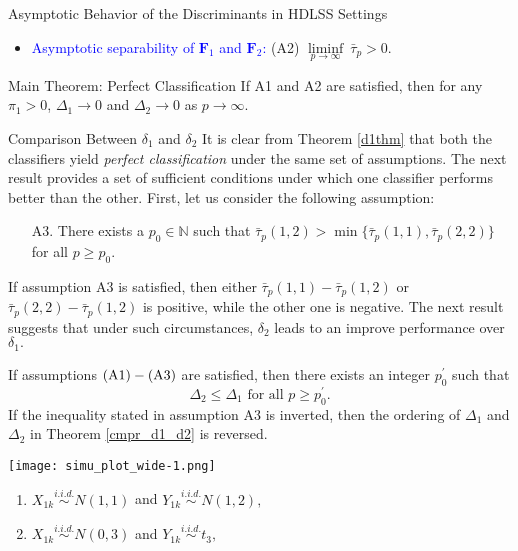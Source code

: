 \documentclass[aspectratio=169, 14pt]{beamer}
\newlength{\colwidth}
\newcommand{\bF}{\mathbf{F}}
\newcommand{\0}{\mathbf{0}}
\newcommand{\1}{\mathbf{1}}
\begin{document}
\begin{frame}[t]
\begin{columns}[t]
\begin{column}{\colwidth}
\begin{block}{Asymptotic Behavior of the Discriminants in HDLSS Settings}
\begin{itemize}
\item \textcolor{blue}{Asymptotic separability of $\bF_1$ and $\bF_2$:}
 (A2) $\liminf \limits_{p\to\infty}\ \bar{\tau}_p>0.$
\end{itemize}
\end{block}
\begin{alertblock}{Main Theorem: Perfect Classification}
 If {\rm A1} and {\rm A2} are satisfied, then for any $\pi_1>0$,
$\Delta_1\to 0$ and $\Delta_2\to 0$ as $p\to\infty $.
\end{alertblock}
\begin{block}{Comparison Between $\delta_1$ and $\delta_2$}
It is clear from Theorem \ref{d1thm} that both the classifiers yield {\it perfect classification} under the same set of assumptions. The next result provides a set of sufficient conditions under which one classifier performs better than the other. First, let us consider the following assumption:
\begin{enumerate}
 \item[A3.] There exists a $p_0\in\mathbb{N}$ such that $\bar{\tau}_p(1,2)>\min\{\bar{\tau}_p(1,1),\bar{\tau}_p(2,2)\}$ for all $p\ge p_0.$
\end{enumerate}
If assumption A3 is satisfied, then either $\bar{\tau}_p(1,1)-\bar{\tau}_p(1,2)$ or $\bar{\tau}_p(2,2)-\bar{\tau}_p(1,2)$ is positive, while the other one is negative. The next result suggests that under such circumstances, $\delta_2$ leads to an improve performance over $\delta_1.$
\end{block}
\begin{block}{}
If assumptions ${\rm (A1)}-{\rm (A3)}$ are satisfied, then there exists an integer $p^\prime_0$ such that
$$\Delta_{2} \leq \Delta_{1} \text{ for all } p\geq p^\prime_0.$$
If the inequality stated in assumption A3 is inverted, then the ordering of $\Delta_1$ and $\Delta_2$ in Theorem \ref{cmpr_d1_d2} is reversed.
\end{block}
\begin{block}
\texttt{[image: simu\_plot\_wide-1.png]}
\end{block} 
\begin{examples}%
\begin{multicols}{2}
\begin{enumerate}
    \item $X_{1k}\stackrel{i.i.d.}{\sim} N(1,1)$ and $Y_{1k}\stackrel{i.i.d.}{\sim} N(1,2),$
    \item $X_{1k}\stackrel{i.i.d.}{\sim} N(0,3)$ and $Y_{1k}\stackrel{i.i.d.}{\sim} t_3,$

\end{enumerate}
\end{multicols}
\end{examples}
\end{column}
\end{columns}
\end{frame}
\end{document}
